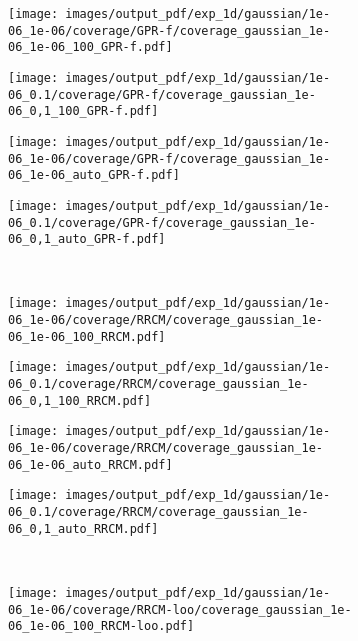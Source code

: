 \documentclass[a4paper,14pt]{extarticle}
\begin{document}
\begin{figure}%
  \centering
  \begin{subfigure}[b]{0.25\linewidth}
    \texttt{[image: images/output\_pdf/exp\_1d/gaussian/1e-06\_1e-06/coverage/GPR-f/coverage\_gaussian\_1e-06\_1e-06\_100\_GPR-f.pdf]}
  \end{subfigure}%
  \begin{subfigure}[b]{0.25\linewidth}
    \texttt{[image: images/output\_pdf/exp\_1d/gaussian/1e-06\_0.1/coverage/GPR-f/coverage\_gaussian\_1e-06\_0,1\_100\_GPR-f.pdf]}
  \end{subfigure}%
  \begin{subfigure}[b]{0.25\linewidth}
    \texttt{[image: images/output\_pdf/exp\_1d/gaussian/1e-06\_1e-06/coverage/GPR-f/coverage\_gaussian\_1e-06\_1e-06\_auto\_GPR-f.pdf]}
  \end{subfigure}%
  \begin{subfigure}[b]{0.25\linewidth}
    \texttt{[image: images/output\_pdf/exp\_1d/gaussian/1e-06\_0.1/coverage/GPR-f/coverage\_gaussian\_1e-06\_0,1\_auto\_GPR-f.pdf]}
  \end{subfigure}\\
  \begin{subfigure}[b]{0.25\linewidth}
    \texttt{[image: images/output\_pdf/exp\_1d/gaussian/1e-06\_1e-06/coverage/RRCM/coverage\_gaussian\_1e-06\_1e-06\_100\_RRCM.pdf]}
  \end{subfigure}%
  \begin{subfigure}[b]{0.25\linewidth}
    \texttt{[image: images/output\_pdf/exp\_1d/gaussian/1e-06\_0.1/coverage/RRCM/coverage\_gaussian\_1e-06\_0,1\_100\_RRCM.pdf]}
  \end{subfigure}%
  \begin{subfigure}[b]{0.25\linewidth}
    \texttt{[image: images/output\_pdf/exp\_1d/gaussian/1e-06\_1e-06/coverage/RRCM/coverage\_gaussian\_1e-06\_1e-06\_auto\_RRCM.pdf]}
  \end{subfigure}%
  \begin{subfigure}[b]{0.25\linewidth}
    \texttt{[image: images/output\_pdf/exp\_1d/gaussian/1e-06\_0.1/coverage/RRCM/coverage\_gaussian\_1e-06\_0,1\_auto\_RRCM.pdf]}
  \end{subfigure}\\
  \begin{subfigure}[b]{0.25\linewidth}
    \texttt{[image: images/output\_pdf/exp\_1d/gaussian/1e-06\_1e-06/coverage/RRCM-loo/coverage\_gaussian\_1e-06\_1e-06\_100\_RRCM-loo.pdf]}

\end{subfigure}
\end{figure}
\end{document}
